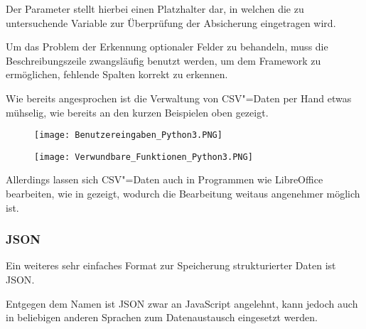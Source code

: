                 Der Parameter
                 stellt hierbei einen Platzhalter dar,
                in welchen die zu untersuchende Variable zur Überprüfung der Absicherung eingetragen wird.

                Um das Problem der Erkennung optionaler Felder zu behandeln,
                muss die Beschreibungszeile zwangsläufig benutzt werden,
                um dem Framework zu ermöglichen,
                fehlende Spalten korrekt zu erkennen.

                Wie bereits angesprochen ist die Verwaltung von
                \gls{CSV}"=Daten per Hand etwas mühselig,
                wie bereits an den kurzen Beispielen oben gezeigt.

                \begin{figure}[htp]
                    \centering%
                    \texttt{[image: Benutzereingaben\_Python3.PNG]}
                    \label{fig:Benutzereingaben_Python3}
                \end{figure}

                \begin{figure}[htp]
                    \centering%
                    \texttt{[image: Verwundbare\_Funktionen\_Python3.PNG]}
                    \label{fig:Verwundbare_Funktionen_Python3}
                \end{figure}

                Allerdings lassen sich
                \gls{CSV}"=Daten auch in Programmen wie LibreOffice bearbeiten,
                wie in
                 gezeigt,
                wodurch die Bearbeitung weitaus angenehmer möglich ist.

            \subsubsection{JSON}
                Ein weiteres sehr einfaches Format zur Speicherung strukturierter Daten ist
                \gls{JSON}.

                Entgegen dem Namen ist
                \gls{JSON} zwar an JavaScript angelehnt,
                kann jedoch auch in beliebigen anderen Sprachen zum Datenaustausch eingesetzt werden.

